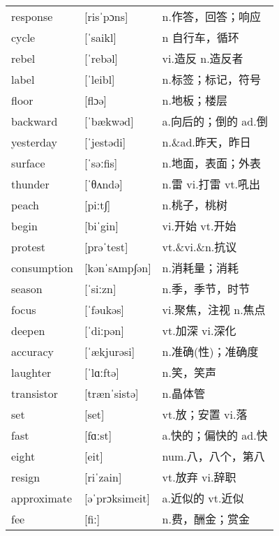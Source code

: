 \documentclass[a4paper]{article}
\begin{document}
\section{}
\begin{tabular}{l l l}

response & [risˈpɔns] & n.作答，回答；响应 \\
cycle & [ˈsaikl] & n 自行车，循环 \\
rebel & [ˈrebəl] & vi.造反 n.造反者 \\
label & [ˈleibl] & n.标签；标记，符号 \\
floor & [flɔə] & n.地板；楼层 \\
backward & [ˈbækwəd] & a.向后的；倒的 ad.倒 \\
yesterday & [ˈjestədi] & n.\&ad.昨天，昨日 \\
surface & [ˈsəːfis] & n.地面，表面；外表 \\
thunder & [ˈθʌndə] & n.雷 vi.打雷 vt.吼出 \\
peach & [piːt∫] & n.桃子，桃树 \\
begin & [biˈgin] & vi.开始 vt.开始 \\
protest & [prəˈtest] & vt.\&vi.\&n.抗议 \\
consumption & [kənˈsʌmp∫ən] & n.消耗量；消耗 \\
season & [ˈsiːzn] & n.季，季节，时节 \\
focus & [ˈfəukəs] & vi.聚焦，注视 n.焦点 \\
deepen & [ˈdiːpən] & vt.加深 vi.深化 \\
accuracy & [ˈækjurəsi] & n.准确(性)；准确度 \\
laughter & [ˈlɑːftə] & n.笑，笑声 \\
transistor & [trænˈsistə] & n.晶体管 \\
set & [set] & vt.放；安置 vi.落 \\
fast & [fɑːst] & a.快的；偏快的 ad.快 \\
eight & [eit] & num.八，八个，第八 \\
resign & [riˈzain] & vt.放弃 vi.辞职 \\
approximate & [əˈprɔksimeit] & a.近似的 vt.近似 \\
fee & [fiː] & n.费，酬金；赏金 \\

\end{tabular}
\end{document}
